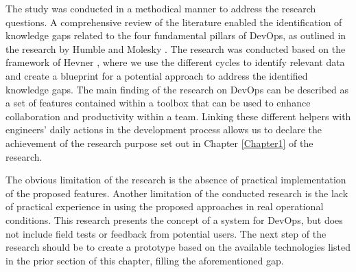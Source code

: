 The study was conducted in a methodical manner to address the research questions. A comprehensive review of the literature enabled the identification of knowledge gaps related to the four fundamental pillars of \ac{DevOps}, as outlined in the research by Humble and Molesky \cite{HumbleMolesky2011}. The research was conducted based on the framework of Hevner \cite{Hevner2004}, where we use the different cycles to identify relevant data and create a blueprint for a potential approach to address the identified knowledge gaps.
The main finding of the research on \ac{DevOps} can be described as a set of features contained within a toolbox that can be used to enhance collaboration and productivity within a team. Linking these different helpers with engineers' daily actions in the development process allows us to declare the achievement of the research purpose set out in Chapter \ref{Chapter1} of the research.

The obvious limitation of the research is the absence of practical implementation of the proposed features. Another limitation of the conducted research is the lack of practical experience in using the proposed approaches in real operational conditions. This research presents the concept of a system for \ac{DevOps}, but does not include field tests or feedback from potential users. The next step of the research should be to create a prototype based on the available technologies listed in the prior section of this chapter, filling the aforementioned gap.